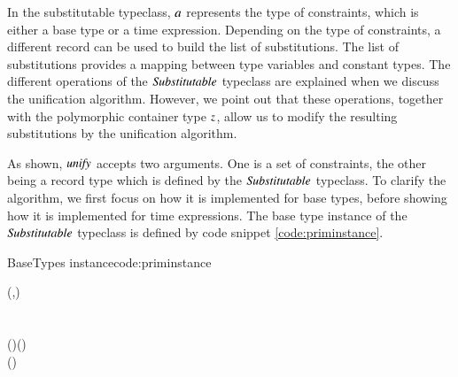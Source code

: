 In the substitutable typeclass, \ensuremath{\Varid{a}} represents the type of constraints, which is either a base type or a time expression.
Depending on the type of constraints, a different record can be used to build the list of substitutions.
The list of substitutions provides a mapping between type variables and constant types.
The different operations of the \ensuremath{\Conid{Substitutable}} typeclass are explained when we discuss the unification algorithm.
However, we point out that these operations, together with the polymorphic container type \ensuremath{\Varid{z}}, allow us to modify the resulting substitutions by the unification algorithm.

As shown, \ensuremath{\Varid{unify}} accepts two arguments.
One is a set of constraints, the other being a record type which is defined by the \ensuremath{\Conid{Substitutable}} typeclass.
To clarify the algorithm, we first focus on how it is implemented for base types, before showing how it is implemented for time expressions.
The base type instance of the \ensuremath{\Conid{Substitutable}} typeclass is defined by code snippet \ref{code:priminstance}.

\begin{texexptitled}{BaseTypes instance}{code:priminstance}
\begin{hscode}\SaveRestoreHook
{}%
%
%
%
\>[B]{}\;\;\mathrel{=}(\;,\;){}\<[E]%
\\
\>[B]{}\;\mathrel{=}\<[E]%
\\[\blanklineskip]%
\>[B]{}\;\;\;\;\<[E]%
\\
\>[B]{}\<[5]%
\>[5]{}\;\;(\;)\mathrel{=}\;(\mathbin{:}){}\<[E]%
\\
\>[B]{}\<[5]%
\>[5]{}\;\;(\;)\mathrel{=}\mathbin{\$}\;\<[E]%
\\
\>[B]{}\<[5]%
\>[5]{}\;\;\;\<[E]%
\\
\>[5]{}\<[9]%
\>[9]{}\mid {}\equiv {}\mathrel{=}\<[E]%
\\
\>[5]{}\<[9]%
\>[9]{}\mid {}\mathrel{=}\;\<[E]%
\ColumnHook
\end{hscode}\resethooks
\end{texexptitled}

